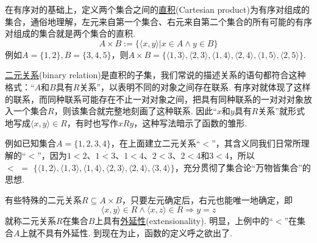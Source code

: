 \documentclass[UTF8]{ctexart}
\begin{document}
在有序对的基础上，定义两个集合之间的\uline{直积}(Cartesian product)为有序对组成的集合，通俗地理解，左元来自第一个集合、右元来自第二个集合的所有可能的有序对组成的集合就是两个集合的直积.
\[A \times B := \{\langle x,y \rangle | x \in A \wedge y \in B\}\] 
例如\(A=\{1,2\},B=\{3,4,5\}\)，则\(A\times B=\{\langle 1,3 \rangle,\langle 2,3 \rangle,\langle 1,4 \rangle,\langle 2,4 \rangle,\langle 1,5 \rangle,\langle 2,5 \rangle\}\).

\uline{二元关系}(binary relation)是直积的子集，我们常说的描述关系的语句都符合这种格式：“\(A\)和\(B\)具有\(R\)关系”，以表明不同的对象之间存在联系. 有序对就体现了这样的联系，而同种联系可能存在不止一对对象之间，把具有同种联系的一对对对象放入一个集合\(R\)，则该集合就完整地刻画了这种联系. 因此“\(x\)和\(y\)具有\(R\)关系”就形式地写成\(\langle x,y \rangle \in R\)，有时也写作\(xRy\)，这种写法暗示了函数的雏形.

例如已知集合\(A=\{1,2,3,4\}\)，在上面建立二元关系“\(<\)”，其含义同我们日常所理解的“\(<\)”，因为\(1<2\)、\(1<3\)、\(1<4\)、\(2<3\)、\(2<4\)和\(3<4\)，所以\(<\,\,=\,\,\{\langle 1,2 \rangle,\langle 1,3 \rangle,\langle 1,4 \rangle,\langle 2,3 \rangle,\langle 2,4 \rangle,\langle 3,4 \rangle\}\)，充分贯彻了集合论“万物皆集合”的思想.

有些特殊的二元关系\(R \subseteq A \times B\)，只要左元确定后，右元也能唯一地确定，即
\[\langle x,y \rangle \in R \wedge \langle x,z \rangle \in R \Rightarrow y=z\]
就称二元关系\(R\)在集合\(B\)上具有\uline{外延性}(extensionality). 明显，上例中的“\(<\)”在集合\(A\)上就不具有外延性. 到现在为止，函数的定义呼之欲出了.
\end{document}
